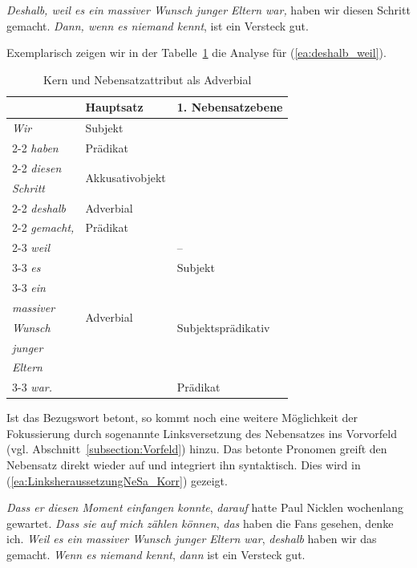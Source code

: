 \ea \label{ea:Bezugswort_AdvNeSaTOP}
\ea \label{ea:deshalb_weilTop} \textit{Deshalb, weil es ein massiver Wunsch junger Eltern war,} haben wir diesen Schritt gemacht. 
\ex \label{ex:dann_wennTOP} \textit{Dann, wenn es niemand kennt}, ist ein Versteck gut.  
\z 
\z 

Exemplarisch zeigen wir in der Tabelle~\ref{tab:deshalb_weil} die Analyse für (\ref{ea:deshalb_weil}).

\begin{table}
  \centering
  \begin{tabular}{l|l|l}
      &  Hauptsatz   &  1. Nebensatzebene \\
    \hline
    \textit{Wir} & Subjekt & \\ \cline{2-2}
    \textit{haben} & Prädikat  & \\ \cline{2-2}
    \textit{diesen} & \multirow{2}{*}{Akkusativobjekt} & \\  
    \textit{Schritt} & &  \\ \cline{2-2}  
    \textit{deshalb} & Adverbial & \\ \cline{2-2}
    \textit{gemacht,} & Prädikat & \\ \cline{2-3} 
    \textit{weil} & \multirow{8}{*}{Adverbial} & -- \\ \cline{3-3}
    \textit{es} & & Subjekt  \\ \cline{3-3}
    \textit{ein} & & \multirow{5}{*}{Subjektsprädikativ} \\ 
    \textit{massiver} & & \\ 
    \textit{Wunsch} &  & \\ 
    \textit{junger} & & \\
    \textit{Eltern} & & \\ \cline{3-3}
    \textit{war.} & & Prädikat\\ 
    \hline 
  \end{tabular}
  \caption{Kern und Nebensatzattribut als Adverbial}
  \label{tab:deshalb_weil}
\end{table}

Ist das Bezugswort betont, so kommt noch eine weitere Möglichkeit der Fokussierung durch sogenannte Linksversetzung des Nebensatzes ins Vorvorfeld (vgl. Abschnitt~\ref{subsection:Vorfeld}) hinzu. Das betonte Pronomen greift den Nebensatz direkt wieder auf und integriert ihn syntaktisch. Dies wird in (\ref{ea:LinksheraussetzungNeSa_Korr}) gezeigt.

\ea \label{ea:LinksheraussetzungNeSa_Korr}
\ea \label{ea:dass_darauf_VF} \textit{Dass er diesen Moment einfangen konnte}, \textit{darauf} hatte Paul Nicklen wochenlang gewartet.
\ex \label{ex:dass_das_VF} \textit{Dass sie auf mich zählen können}, \textit{das} haben die Fans gesehen, denke ich.
\ex \label{ex:weil_deshalb_VF} \textit{Weil es ein massiver Wunsch junger Eltern war}, \textit{deshalb} haben wir das gemacht.
\ex \label{ex:wenn_dann_VF} \textit{Wenn es niemand kennt}, \textit{dann} ist ein Versteck gut.
\z
\z 

